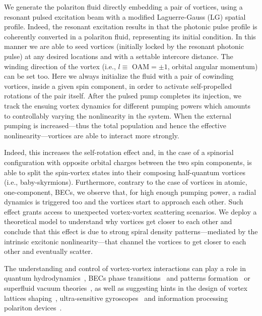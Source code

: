 \documentclass[aps,prb,twocolumn,superscriptaddress,nofootinbib]{revtex4}
\def\editr#1{#1}
\def\refer#1{#1}
\def\edstrike#1{}
\begin{document}
We \edstrike{imprint} \refer{generate the polariton fluid directly embedding a pair of vortices,} using a resonant pulsed excitation beam with a
modified Laguerre-Gauss (LG) spatial profile.
\refer{Indeed, the resonant excitation results in that the photonic pulse profile is coherently converted
in a polariton fluid, representing its initial condition.}
In this manner
we are able to seed vortices (initially locked
by the resonant photonic \editr{pulse}) at any desired locations \editr{and with a settable intercore distance}.
\editr{The winding direction of the vortex (i.e., $l \equiv \text{ OAM}=\pm1$, orbital angular momentum)
can be set too.
Here we always initialize the fluid with a pair of cowinding vortices, inside a given spin component,
in order to activate self-propelled rotations of the pair itself}.
After the pulsed pump \edstrike{is removed} \refer{completes its injection}, we
track the ensuing vortex dynamics for different pumping \edstrike{rates} \editr{powers} which amounts to
controllably varying the nonlinearity in the system.
%
When the external pumping is increased---thus the total
population and hence the effective nonlinearity---vortices are able to interact
more strongly.
%
\editr{
Indeed, this increases the self-rotation effect \edstrike{for cowinding vortices} and,
in the case of a spinorial configuration with opposite orbital charges between the two spin components,
is able to split the spin-vortex states into their
composing half-quantum vortices (i.e., baby-skyrmions\cite{donati_twist_2016}).}
%
Furthermore, contrary to the case of vortices in atomic, one-component, BECs,
we observe that, for high enough pumping power, \edstrike{after a transient dynamical stage,}
\editr{a radial dynamics is triggered too and the} vortices start to approach each other.
%
Such \edstrike{unusual} effect grants access to \edstrike{novel} \editr{unexpected} vortex-vortex scattering scenarios.
%
We deploy a theoretical model to understand why vortices get closer to each
other and conclude that this effect is due to strong spiral density patterns---mediated by 
the intrinsic
excitonic nonlinearity---that channel the vortices to get closer to each other and eventually scatter.
%
\edstrike{This work can offer hints on the design of polariton vortex devices 
and also sustain novel paradigms
for the interpretation of elementary particles
and of their interactions
in the context of superfluid vacuum theories~\cite{Huang20161}.}
\editr{The understanding and control of vortex-vortex interactions can play a role in
quantum hydrodynamics~\cite{tsubota_quantum_2013},
BECs phase transitions~\cite{dagvadorj_nonequilibrium_2015} and patterns formation~\cite{zhao_pattern_2017}
or superfluid vacuum theories~\cite{Huang20161},
as well as suggesting hints in the design of
vortex lattices shaping~\cite{Hivet2014},
ultra-sensitive gyroscopes~\cite{Franchetti2012} and
information processing polariton devices~\cite{Sigurdsson2014}.}\\
\end{document}
